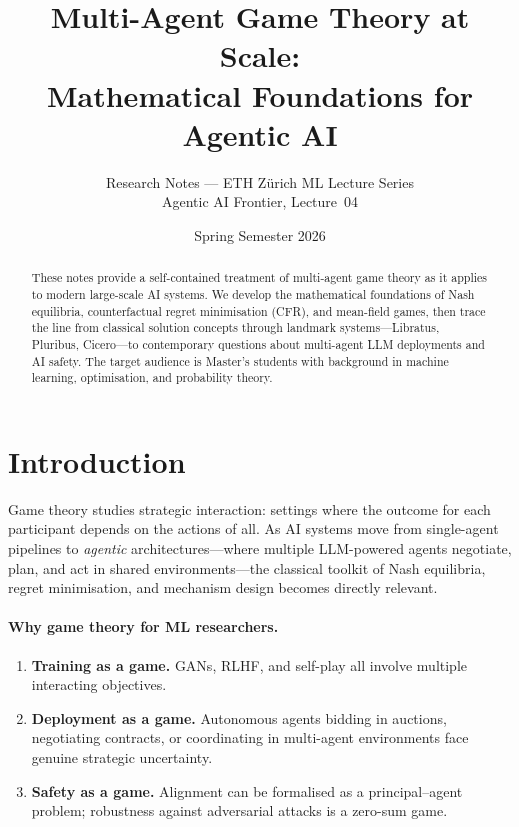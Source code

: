\documentclass[11pt,a4paper]{article}
\title{\textbf{Multi-Agent Game Theory at Scale:\\
Mathematical Foundations for Agentic AI}}
\author{Research Notes --- ETH Z\"urich ML Lecture Series\\[4pt]
\small Agentic AI Frontier, Lecture~04}
\date{Spring Semester 2026}
\theoremstyle{plain}
\theoremstyle{definition}
\begin{document}
\maketitle

\begin{abstract}
These notes provide a self-contained treatment of multi-agent game theory
as it applies to modern large-scale AI systems.  We develop the
mathematical foundations of Nash equilibria, counterfactual regret
minimisation (CFR), and mean-field games, then trace the line from
classical solution concepts through landmark systems---Libratus, Pluribus,
Cicero---to contemporary questions about multi-agent LLM deployments and
AI safety.  The target audience is Master's students with background in
machine learning, optimisation, and probability theory.
\end{abstract}

\tableofcontents
\newpage

\section{Introduction}\label{sec:intro}

Game theory studies strategic interaction: settings where the outcome for
each participant depends on the actions of all.  As AI systems move from
single-agent pipelines to \emph{agentic} architectures---where multiple
LLM-powered agents negotiate, plan, and act in shared
environments---the classical toolkit of Nash equilibria, regret
minimisation, and mechanism design becomes directly relevant.

\paragraph{Why game theory for ML researchers.}
\begin{enumerate}[label=(\roman*)]
  \item \textbf{Training as a game.}  GANs, RLHF, and self-play all
    involve multiple interacting objectives.
  \item \textbf{Deployment as a game.}  Autonomous agents bidding in
    auctions, negotiating contracts, or coordinating in multi-agent
    environments face genuine strategic uncertainty.
  \item \textbf{Safety as a game.}  Alignment can be formalised as a
    principal--agent problem; robustness against adversarial attacks is a
    zero-sum game.
\end{enumerate}
\end{document}
